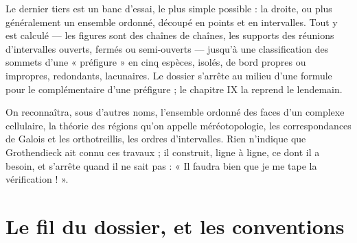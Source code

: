 \documentclass[11pt,a4paper]{article}
\begin{document}
\begin{resume}
Le dernier tiers est un banc d'essai, le plus simple possible : la droite,
ou plus généralement un ensemble ordonné, découpé en points et en intervalles.
Tout y est calculé --- les figures sont des chaînes de chaînes, les supports
des réunions d'intervalles ouverts, fermés ou semi-ouverts --- jusqu'à une
classification des sommets d'une « préfigure » en cinq espèces, isolés,
de bord propres ou impropres, redondants, lacunaires. Le dossier s'arrête au
milieu d'une formule pour le complémentaire d'une préfigure ; le chapitre IX
la reprend le lendemain.

On reconnaîtra, sous d'autres noms, l'ensemble ordonné des faces d'un complexe
cellulaire, la théorie des régions qu'on appelle méréotopologie, les
correspondances de Galois et les orthotreillis, les ordres d'intervalles. Rien
n'indique que Grothendieck ait connu ces travaux ; il construit, ligne à
ligne, ce dont il a besoin, et s'arrête quand il ne sait pas : « Il faudra
bien que je me tape la vérification ! ».

\end{resume}

\section*{Le fil du dossier, et les conventions}
\end{document}
